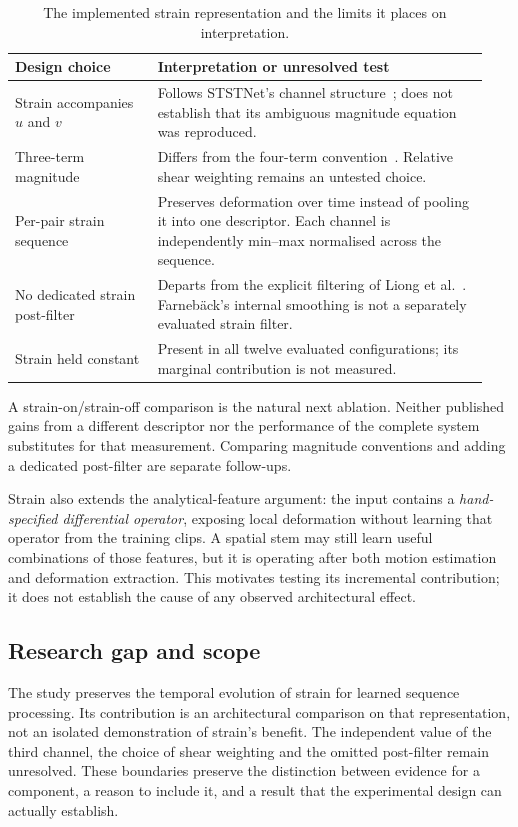 \begin{table}[htbp]
    \centering
    \small
    \begin{tabular}{@{}p{0.29\linewidth} p{0.65\linewidth}@{}}
        \hline
        \textbf{Design choice} & \textbf{Interpretation or unresolved test} \\
        \hline
        Strain accompanies $u$ and $v$
        & Follows STSTNet's channel structure~\cite{liong2019b}; does not establish that its ambiguous magnitude equation was reproduced. \\
        Three-term magnitude
        & Differs from the four-term convention~\cite{liong2014a,liong2014b,liong2016}. Relative shear weighting remains an untested choice. \\
        Per-pair strain sequence
        & Preserves deformation over time instead of pooling it into one descriptor. Each channel is independently min--max normalised across the sequence. \\
        No dedicated strain post-filter
        & Departs from the explicit filtering of Liong et al.~\cite{liong2014a}. Farneb\"ack's internal smoothing is not a separately evaluated strain filter. \\
        Strain held constant
        & Present in all twelve evaluated configurations; its marginal contribution is not measured. \\
        \hline
    \end{tabular}
    \caption[Strain representation and unresolved choices]{The implemented strain representation and the limits it places on interpretation.}
    \label{tab:strain-decisions}
\end{table}

A strain-on/strain-off comparison is the natural next ablation. Neither published gains from a different descriptor nor the performance of the complete system substitutes for that measurement. Comparing magnitude conventions and adding a dedicated post-filter are separate follow-ups.

Strain also extends the analytical-feature argument: the input contains a \textit{hand-specified differential operator}, exposing local deformation without learning that operator from the training clips. A spatial stem may still learn useful combinations of those features, but it is operating after both motion estimation and deformation extraction. This motivates testing its incremental contribution; it does not establish the cause of any observed architectural effect.

\subsection{Research gap and scope}
\label{sec:strain-gap}

The study preserves the temporal evolution of strain for learned sequence processing. Its contribution is an architectural comparison on that representation, not an isolated demonstration of strain's benefit. The independent value of the third channel, the choice of shear weighting and the omitted post-filter remain unresolved. These boundaries preserve the distinction between evidence for a component, a reason to include it, and a result that the experimental design can actually establish.
